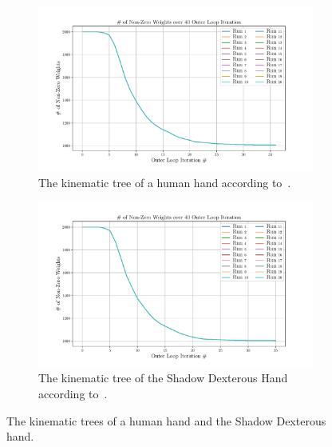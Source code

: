 \begin{figure}[!h]
	\centering
	\begin{subfigure}[b]{0.48\textwidth}
		\centering
		\includegraphics[width=\textwidth]{chapters/2-pose-estimation/fig/GNC-TLS-w-run-50-conv.pdf}
		\caption{The kinematic tree of a human hand according to~\cite{grasp-synthesis-algorithms-for-multifingered-robot-hands}.\newline}
		\label{app:GNC-TLS-w-run-50-conv}
	\end{subfigure}
	\hfill
	\begin{subfigure}[b]{0.48\textwidth}
		\centering
		\includegraphics[width=\textwidth]{chapters/2-pose-estimation/fig/GNC-TLS-w-run-60-conv.pdf}
		\caption{The kinematic tree of the Shadow Dexterous Hand according to~\cite{robot-hand-kinematics}. \newline}
		\label{app:GNC-TLS-w-run-60-conv}
	\end{subfigure}
	\caption{The kinematic trees of a human hand and the Shadow Dexterous hand.}
	\label{app:GNC-TLS-w-run-50-60-conv}
\end{figure}

